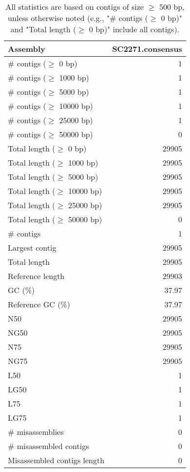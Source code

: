 \documentclass[12pt,a4paper]{article}
\begin{document}
\begin{table}[ht]
\begin{center}
\caption{All statistics are based on contigs of size $\geq$ 500 bp, unless otherwise noted (e.g., "\# contigs ($\geq$ 0 bp)" and "Total length ($\geq$ 0 bp)" include all contigs).}
\begin{tabular}{|l*{1}{|r}|}
\hline
Assembly & SC2271.consensus \\ \hline
\# contigs ($\geq$ 0 bp) & 1 \\ \hline
\# contigs ($\geq$ 1000 bp) & 1 \\ \hline
\# contigs ($\geq$ 5000 bp) & 1 \\ \hline
\# contigs ($\geq$ 10000 bp) & 1 \\ \hline
\# contigs ($\geq$ 25000 bp) & 1 \\ \hline
\# contigs ($\geq$ 50000 bp) & 0 \\ \hline
Total length ($\geq$ 0 bp) & 29905 \\ \hline
Total length ($\geq$ 1000 bp) & 29905 \\ \hline
Total length ($\geq$ 5000 bp) & 29905 \\ \hline
Total length ($\geq$ 10000 bp) & 29905 \\ \hline
Total length ($\geq$ 25000 bp) & 29905 \\ \hline
Total length ($\geq$ 50000 bp) & 0 \\ \hline
\# contigs & 1 \\ \hline
Largest contig & 29905 \\ \hline
Total length & 29905 \\ \hline
Reference length & 29903 \\ \hline
GC (\%) & 37.97 \\ \hline
Reference GC (\%) & 37.97 \\ \hline
N50 & 29905 \\ \hline
NG50 & 29905 \\ \hline
N75 & 29905 \\ \hline
NG75 & 29905 \\ \hline
L50 & 1 \\ \hline
LG50 & 1 \\ \hline
L75 & 1 \\ \hline
LG75 & 1 \\ \hline
\# misassemblies & 0 \\ \hline
\# misassembled contigs & 0 \\ \hline
Misassembled contigs length & 0 \\ \hline

\end{tabular}
\end{center}
\end{table}
\end{document}
